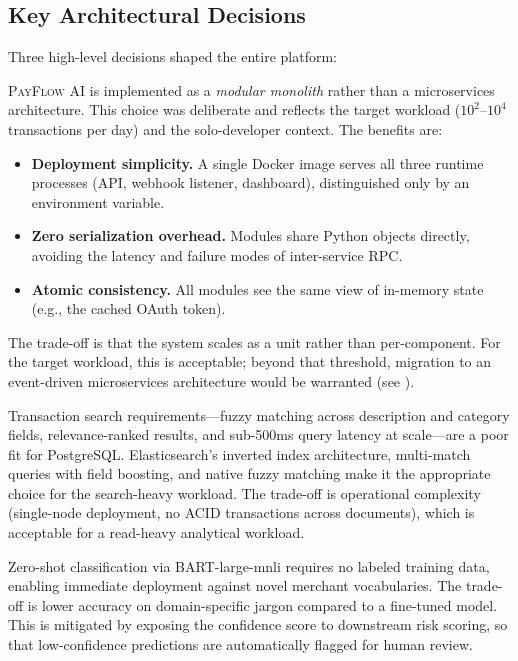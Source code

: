 \documentclass[11pt,a4paper]{article}
\newcommand{\payflow}{\textsc{PayFlow AI}}
\begin{document}
\subsection{Key Architectural Decisions}

Three high-level decisions shaped the entire platform:

\begin{definitionbox}
\payflow{} is implemented as a \emph{modular monolith} rather than a microservices architecture. This choice was deliberate and reflects the target workload ($10^2$--$10^4$ transactions per day) and the solo-developer context. The benefits are:
\begin{itemize}
  \item \textbf{Deployment simplicity.} A single Docker image serves all three runtime processes (API, webhook listener, dashboard), distinguished only by an environment variable.
  \item \textbf{Zero serialization overhead.} Modules share Python objects directly, avoiding the latency and failure modes of inter-service RPC.
  \item \textbf{Atomic consistency.} All modules see the same view of in-memory state (e.g., the cached OAuth token).
\end{itemize}
The trade-off is that the system scales as a unit rather than per-component. For the target workload, this is acceptable; beyond that threshold, migration to an event-driven microservices architecture would be warranted (see ).
\end{definitionbox}

\begin{definitionbox}
Transaction search requirements---fuzzy matching across description and category fields, relevance-ranked results, and sub-500ms query latency at scale---are a poor fit for PostgreSQL. Elasticsearch's inverted index architecture, multi-match queries with field boosting, and native fuzzy matching make it the appropriate choice for the search-heavy workload. The trade-off is operational complexity (single-node deployment, no ACID transactions across documents), which is acceptable for a read-heavy analytical workload.
\end{definitionbox}

\begin{definitionbox}
Zero-shot classification via BART-large-mnli requires no labeled training data, enabling immediate deployment against novel merchant vocabularies. The trade-off is lower accuracy on domain-specific jargon compared to a fine-tuned model. This is mitigated by exposing the confidence score to downstream risk scoring, so that low-confidence predictions are automatically flagged for human review.
\end{definitionbox}
\end{document}
